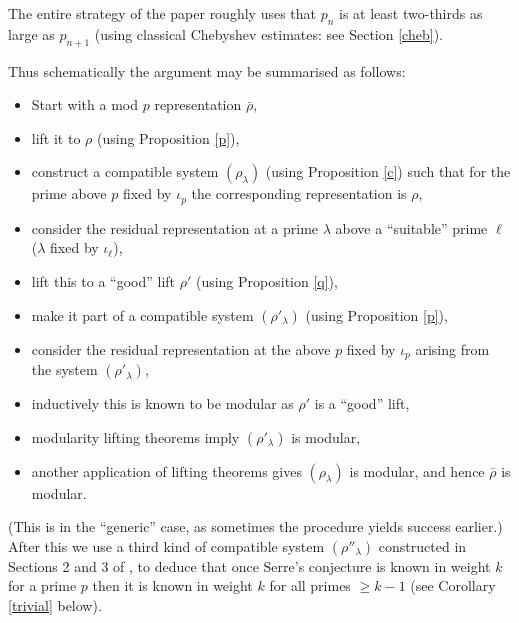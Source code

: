 \documentclass[12pt]{amsart}
\newcommand{\rhobar}{\overline{\rho}}
\def\rhobar{ {\bar {\rho} } }
\begin{document}
The entire strategy of the paper roughly uses that $p_n$ 
is at least two-thirds as large as $p_{n+1}$ (using classical Chebyshev estimates: 
see Section \ref{cheb}). 

Thus schematically the argument may be summarised as follows:
\begin{itemize}

\item Start with a mod $p$ representation
$\rhobar$,

\item lift it to $\rho$ (using Proposition \ref{p}), 

\item construct a compatible system
$(\rho_{\lambda})$ (using Proposition \ref{c}) such that for the prime above $p$ fixed by $\iota_p$ the corresponding representation
is $\rho$, 

\item consider the residual representation at a prime $\lambda$ above 
a ``suitable'' prime $\ell$ ($\lambda$ fixed by $\iota_\ell$), 


\item lift this to a  ``good'' lift  $\rho'$  (using Proposition \ref{q}), 

\item make it part of a compatible system 
$(\rho'_{\lambda})$ (using Proposition \ref{p}),  

\item consider the residual representation at the above $p$ fixed by $\iota_p$
arising from the system $(\rho'_{\lambda})$, 

\item inductively this is known to be modular as $\rho'$ is a ``good'' lift, 

\item modularity lifting theorems imply $(\rho'_{\lambda})$ is modular, 

\item another application of lifting theorems gives  $(\rho_{\lambda})$ is modular, and hence $\rhobar$ is modular. 
\end{itemize}

\noindent (This is in the ``generic'' case, as sometimes the procedure yields success earlier.) After this we use a third kind of compatible system 
$(\rho''_{\lambda})$ constructed in Sections 2 and 3 of \cite{KW}, to deduce that once Serre's conjecture is known in weight $k$ for a prime $p$ then it is known in weight $k$ for all primes $\geq k-1$ (see Corollary \ref{trivial} below).
\end{document}
